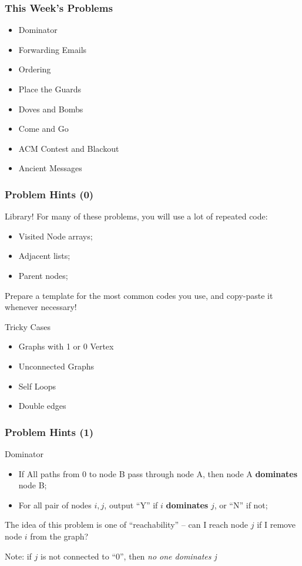 \begin{frame}
  \frametitle{This Week's Problems}
  \begin{itemize}
  \item Dominator
  \item Forwarding Emails
  \item Ordering
  \item Place the Guards
  \item Doves and Bombs
  \item Come and Go
  \item ACM Contest and Blackout
  \item Ancient Messages
  \end{itemize}
\end{frame}

\begin{frame}
  \frametitle{Problem Hints (0)}

  {\smaller
  \begin{block}{Library!}
    For many of these problems, you will use a lot of repeated code:
    \begin{itemize}
    \item Visited Node arrays;
    \item Adjacent lists;
    \item Parent nodes;
    \end{itemize}

    \bigskip

    Prepare a template for the most common codes you use, and
    copy-paste it whenever necessary!
  \end{block}
  \begin{block}{Tricky Cases}
    \begin{itemize}
    \item Graphs with 1 or 0 Vertex
    \item Unconnected Graphs
    \item Self Loops
    \item Double edges
    \end{itemize}
  \end{block}
  }
\end{frame}

\begin{frame}
  \frametitle{Problem Hints (1)}  
  {\smaller
    \begin{block}{Dominator}
      \begin{itemize}
        \item If All paths from 0 to node B pass through node A, then node A {\bf dominates} node B;
        \item For all pair of nodes $i,j$, output ``Y'' if $i$ {\bf dominates} $j$, or ``N'' if not;
      \end{itemize}
    \end{block}

    \bigskip

    The idea of this problem is one of ``reachability'' -- can I reach
    node $j$ if I remove node $i$ from the graph?

    \bigskip

    Note: if $j$ is not connected to ``0'', then \emph{no one dominates j}
  }
\end{frame}

